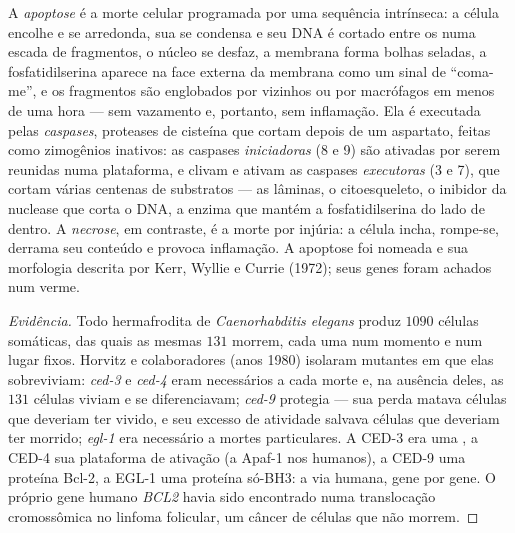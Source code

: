 \begin{definition}[Apoptose]\label{def:b3:cell-cycle-apoptosis:apoptosis}
A \emph{apoptose} é a morte celular programada por uma sequência
intrínseca: a célula encolhe e se arredonda, sua  se condensa
e seu DNA é cortado entre os  numa escada de fragmentos, o
núcleo se desfaz, a membrana forma bolhas seladas, a fosfatidilserina
aparece na face externa da membrana como um sinal de ``coma-me'', e os
fragmentos são englobados por vizinhos ou por macrófagos em menos de
uma hora --- sem vazamento e, portanto, sem inflamação. Ela é executada
pelas \emph{caspases}, proteases de cisteína que cortam depois de um
aspartato, feitas como zimogênios inativos: as caspases
\emph{iniciadoras} (8 e 9) são ativadas por serem reunidas numa
plataforma, e clivam e ativam as caspases \emph{executoras} (3 e 7),
que cortam várias centenas de substratos --- as lâminas, o
citoesqueleto, o inibidor da nuclease que corta o DNA, a enzima que
mantém a fosfatidilserina do lado de dentro. A \emph{necrose}, em
contraste, é a morte por injúria: a célula incha, rompe-se, derrama seu
conteúdo e provoca inflamação. A apoptose foi nomeada e sua morfologia
descrita por Kerr, Wyllie e Currie (1972); seus genes foram achados num
verme.
\end{definition}

\begin{proof}[Evidência]
Todo hermafrodita de \emph{Caenorhabditis elegans} produz $1090$
células somáticas, das quais as mesmas $131$ morrem, cada uma num
momento e num lugar fixos. Horvitz e colaboradores (anos 1980) isolaram
mutantes em que elas sobreviviam: \emph{ced-3} e \emph{ced-4} eram
necessários a cada morte e, na ausência deles, as $131$ células viviam
e se diferenciavam; \emph{ced-9} protegia --- sua perda matava células
que deveriam ter vivido, e seu excesso de atividade salvava células que
deveriam ter morrido; \emph{egl-1} era necessário a mortes
particulares. A CED-3 era uma , a CED-4 sua plataforma de
ativação (a Apaf-1 nos humanos), a CED-9 uma proteína Bcl-2, a EGL-1
uma proteína só-BH3: a via humana, gene por gene. O próprio gene humano
\emph{BCL2} havia sido encontrado numa translocação cromossômica no
linfoma folicular, um câncer de células que não morrem.
\end{proof}

